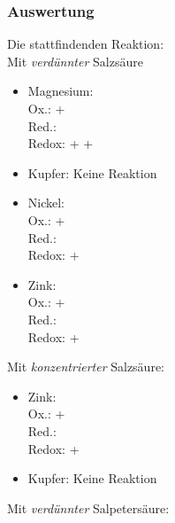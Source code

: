 \documentclass{scrartcl}
\begin{document}
\subsubsection{Auswertung}
Die stattfindenden Reaktion:\\
Mit \emph{verdünnter} Salzsäure
\begin{itemize}
	\item Magnesium: \\
		 Ox.:  \ch{<=>}  +  \\
		 Red.:   \\
		 Redox:  +   + 
	\item Kupfer: Keine Reaktion
	\item Nickel: \\
		Ox.:  \ch{<=>}  +  \\
		Red.:   \\
		Redox:    + 
	\item Zink: \\
		Ox.:  \ch{<=>}  +  \\
		Red.:   \\
		Redox:    + 

\end{itemize}
\newpage
Mit \emph{konzentrierter} Salzsäure:
\begin{itemize}
	\item Zink: \\
		Ox.:  \ch{<=>}  +  \\
		Red.:   \\
		Redox:    + 
	\item Kupfer: Keine Reaktion
\end{itemize}
Mit \emph{verdünnter} Salpetersäure:
\end{document}
